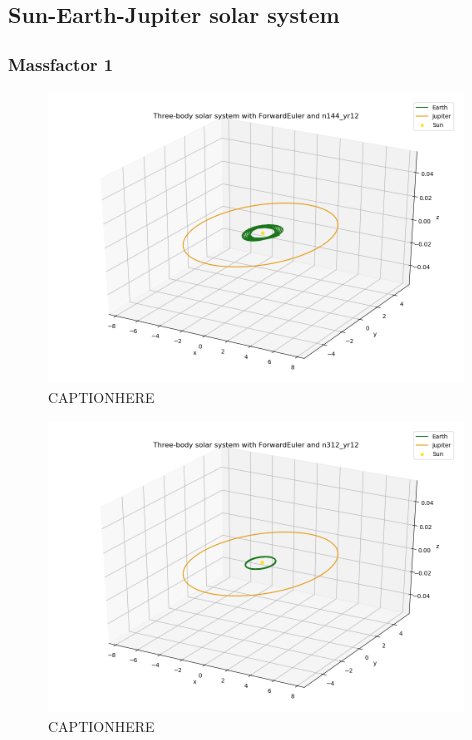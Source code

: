 \documentclass{article}
\begin{document}
\subsection{Sun-Earth-Jupiter solar system}

\subsubsection{Massfactor 1}

    \begin{figure}[H]
        \centering
        \includegraphics[width = 11cm]{img/plot3D_S_E_J_F_n144_yr12.png}
        \caption{CAPTIONHERE}
        \label{fig:plot3D_S_E_J_F_n144_yr12}
    \end{figure}

    \begin{figure}[H]
        \centering
        \includegraphics[width = 11cm]{img/plot3D_S_E_J_F_n312_yr12.png}
        \caption{CAPTIONHERE}
        \label{fig:plot3D_S_E_J_F_n312_yr12}
    \end{figure}
\end{document}

